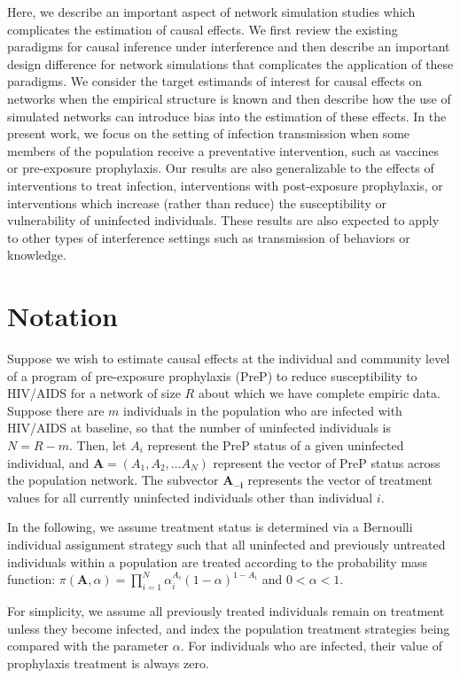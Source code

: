 \documentclass{article}
\theoremstyle{definition}
\begin{document}
Here, we describe an important aspect of network simulation studies which complicates the estimation of causal effects. We first review the existing paradigms for causal inference under interference and then describe an important design difference for network simulations that complicates the application of these paradigms. We consider the target estimands of interest for causal effects on networks when the empirical structure is known and then describe how the use of simulated networks can introduce bias into the estimation of these effects. In the present work, we focus on the setting of infection transmission when some members of the population receive a preventative intervention, such as vaccines or pre-exposure prophylaxis. Our results are also generalizable to the effects of interventions to treat infection, interventions with post-exposure prophylaxis, or interventions which increase (rather than reduce) the susceptibility or vulnerability of uninfected individuals. These results are also expected to apply to other types of interference settings such as transmission of behaviors or knowledge.

\section{Notation}
Suppose we wish to estimate causal effects at the individual and community level of a program of pre-exposure prophylaxis (PreP) to reduce susceptibility to HIV/AIDS for a network of size $R$ about which we have complete empiric data. Suppose there are $m$ individuals in the population who are infected with HIV/AIDS at baseline, so that the number of uninfected individuals is $N = R-m$. Then, let $A_{i}$ represent the PreP status of a given uninfected individual, and $\mathbf{A} = (A_{1}, A_{2}, \ldots A_{N})$ represent the vector of PreP status across the population network. The subvector $\mathbf{A_{-i}}$ represents the vector of treatment values for all currently uninfected individuals other than individual $i$.

In the following, we assume treatment status is determined via a Bernoulli individual assignment strategy such that all uninfected and previously untreated individuals within a population are treated according to the probability mass function:
$\pi(\mathbf{A}, \alpha) = \prod_{i=1}^{N}{\alpha_{i}^{A_{i}}(1-\alpha)^{1-A_{i}}}$ and $0 < \alpha < 1$. 

For simplicity, we assume all previously treated individuals remain on treatment unless they become infected, and index the population treatment strategies being compared with the parameter $\alpha$. For individuals who are infected, their value of prophylaxis treatment is always zero.
\end{document}
